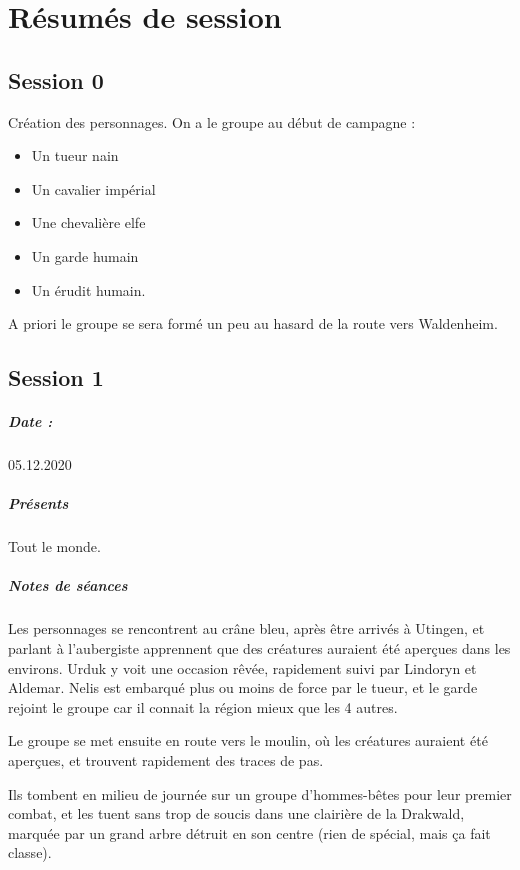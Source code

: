 \documentclass[10pt,a4paper]{book}
\begin{document}
\chapter{Résumés de session}
\section{Session 0}
Création des personnages. On a le groupe au début de campagne :
\begin{itemize}
\item Un tueur nain
\item Un cavalier impérial
\item Une chevalière elfe
\item Un garde humain
\item Un érudit humain.
\end{itemize}
A priori le groupe se sera formé un peu au hasard de la route vers Waldenheim.
\section{Session 1}
\paragraph{Date :}05.12.2020
\paragraph{Présents} Tout le monde.

\paragraph{Notes de séances}
Les personnages se rencontrent au crâne bleu, après être arrivés à Utingen, et parlant à l'aubergiste apprennent que des créatures auraient été aperçues dans les environs. Urduk y voit une occasion rêvée, rapidement suivi par Lindoryn et Aldemar. Nelis est embarqué plus ou moins de force par le tueur, et le garde rejoint le groupe car il connait la région mieux que les 4 autres.

Le groupe se met ensuite en route vers le moulin, où les créatures auraient été aperçues, et trouvent rapidement des traces de pas.

Ils tombent en milieu de journée sur un groupe d'hommes-bêtes pour leur premier combat, et les tuent sans trop de soucis dans une clairière de la Drakwald, marquée par un grand arbre détruit en son centre (rien de spécial, mais ça fait classe).
\end{document}
